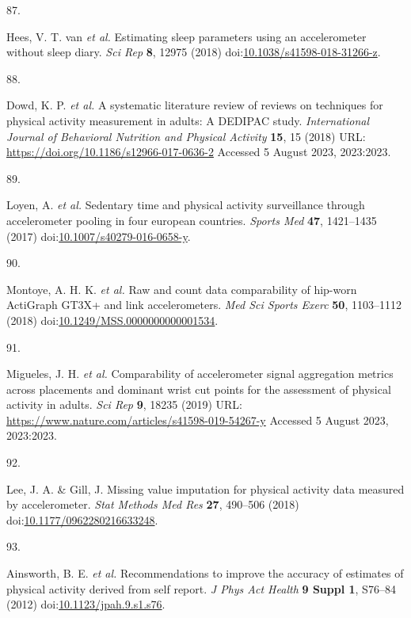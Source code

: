 \documentclass[
  10pt,
]{scrbook}
\newlength{\cslhangindent}
\newlength{\csllabelwidth}
\newlength{\cslentryspacingunit} %
\newenvironment{CSLReferences}[2] %
 {%
  \setlength{\parindent}{0pt}
  \ifodd #1
  \let\oldpar\par
  \def\par{\hangindent=\cslhangindent\oldpar}
  \fi
  \setlength{\parskip}{#2\cslentryspacingunit}
 }%
 {}
\newcommand{\CSLLeftMargin}[1]{\parbox[t]{\csllabelwidth}{#1}}
\newcommand{\CSLRightInline}[1]{\parbox[t]{\linewidth - \csllabelwidth}{#1}\break}
\begin{document}
\begin{CSLReferences}{0}{0}
\leavevmode{}%
\CSLLeftMargin{87. }%
\CSLRightInline{Hees, V. T. van \emph{et al.} Estimating sleep
parameters using an accelerometer without sleep diary. \emph{Sci Rep}
\textbf{8}, 12975 (2018)
doi:\href{https://doi.org/10.1038/s41598-018-31266-z}{10.1038/s41598-018-31266-z}.}

\leavevmode{}%
\CSLLeftMargin{88. }%
\CSLRightInline{Dowd, K. P. \emph{et al.} A systematic literature review
of reviews on techniques for physical activity measurement in adults: A
{DEDIPAC} study. \emph{International Journal of Behavioral Nutrition and
Physical Activity} \textbf{15}, 15 (2018) URL:
\url{https://doi.org/10.1186/s12966-017-0636-2} Accessed 5 August 2023,
2023:2023.}

\leavevmode{}%
\CSLLeftMargin{89. }%
\CSLRightInline{Loyen, A. \emph{et al.} Sedentary time and physical
activity surveillance through accelerometer pooling in four european
countries. \emph{Sports Med} \textbf{47}, 1421--1435 (2017)
doi:\href{https://doi.org/10.1007/s40279-016-0658-y}{10.1007/s40279-016-0658-y}.}

\leavevmode{}%
\CSLLeftMargin{90. }%
\CSLRightInline{Montoye, A. H. K. \emph{et al.} Raw and count data
comparability of hip-worn {ActiGraph} {GT}3X+ and link accelerometers.
\emph{Med Sci Sports Exerc} \textbf{50}, 1103--1112 (2018)
doi:\href{https://doi.org/10.1249/MSS.0000000000001534}{10.1249/MSS.0000000000001534}.}

\leavevmode{}%
\CSLLeftMargin{91. }%
\CSLRightInline{Migueles, J. H. \emph{et al.} Comparability of
accelerometer signal aggregation metrics across placements and dominant
wrist cut points for the assessment of physical activity in adults.
\emph{Sci Rep} \textbf{9}, 18235 (2019) URL:
\url{https://www.nature.com/articles/s41598-019-54267-y} Accessed 5
August 2023, 2023:2023.}

\leavevmode{}%
\CSLLeftMargin{92. }%
\CSLRightInline{Lee, J. A. \& Gill, J. Missing value imputation for
physical activity data measured by accelerometer. \emph{Stat Methods Med
Res} \textbf{27}, 490--506 (2018)
doi:\href{https://doi.org/10.1177/0962280216633248}{10.1177/0962280216633248}.}

\leavevmode{}%
\CSLLeftMargin{93. }%
\CSLRightInline{Ainsworth, B. E. \emph{et al.} Recommendations to
improve the accuracy of estimates of physical activity derived from self
report. \emph{J Phys Act Health} \textbf{9 Suppl 1}, S76--84 (2012)
doi:\href{https://doi.org/10.1123/jpah.9.s1.s76}{10.1123/jpah.9.s1.s76}.}


\end{CSLReferences}
\end{document}
